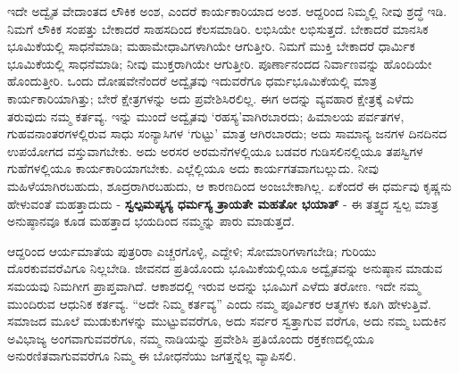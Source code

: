 ಇದೇ ಅದ್ವೈತ ವೇದಾಂತದ ಲೌಕಿಕ ಅಂಶ, ಎಂದರೆ ಕಾರ್ಯಕಾರಿಯಾದ ಅಂಶ. ಆದ್ದರಿಂದ ನಿಮ್ಮಲ್ಲಿ ನೀವು ಶ್ರದ್ಧೆ ಇಡಿ. ನಿಮಗೆ ಲೌಕಿಕ ಸಂಪತ್ತು ಬೇಕಾದರೆ ಸಾಹಸದಿಂದ ಕೆಲಸಮಾಡಿರಿ. ಲಭಿಸಿಯೇ ಲಭಿಸುತ್ತದೆ. ಬೇಕಾದರೆ ಮಾನಸಿಕ ಭೂಮಿಕೆಯಲ್ಲಿ ಸಾಧನೆಮಾಡಿ; ಮಹಾಮೇಧಾವಿಗಳಾಗಿಯೇ ಆಗುತ್ತೀರಿ. ನಿಮಗೆ ಮುಕ್ತಿ ಬೇಕಾದರೆ ಧಾರ್ಮಿಕ ಭೂಮಿಕೆಯಲ್ಲಿ ಸಾಧನೆಮಾಡಿ; ನೀವು ಮುಕ್ತರಾಗಿಯೇ ಆಗುತ್ತೀರಿ. ಪೂರ್ಣಾನಂದದ ನಿರ್ವಾಣವನ್ನು ಹೊಂದಿಯೇ ಹೊಂದುತ್ತೀರಿ. ಒಂದು ದೋಷವೇನೆಂದರೆ ಅದ್ವೈತವು ಇದುವರೆಗೂ ಧರ್ಮಭೂಮಿಕೆಯಲ್ಲಿ ಮಾತ್ರ ಕಾರ್ಯಕಾರಿಯಾಗಿತ್ತು; ಬೇರೆ ಕ್ಷೇತ್ರಗಳನ್ನು ಅದು ಪ್ರವೇಶಿಸಿರಲಿಲ್ಲ. ಈಗ ಅದನ್ನು ವ್ಯವಹಾರ ಕ್ಷೇತ್ರಕ್ಕೆ ಎಳೆದು ತರುವುದು ನಮ್ಮ ಕರ್ತವ್ಯ. ಇನ್ನು ಮುಂದೆ ಅದ್ವೈತವು ‘ರಹಸ್ಯ’ವಾಗಿರಬಾರದು; ಹಿಮಾಲಯ ಪರ್ವತಗಳ, ಗುಹವನಾಂತರಗಳಲ್ಲಿರುವ ಸಾಧು ಸಂನ್ಯಾಸಿಗಳ ‘ಗುಟ್ಟು’ ಮಾತ್ರ ಆಗಿರಬಾರದು; ಅದು ಸಾಮಾನ್ಯ ಜನಗಳ ದಿನದಿನದ ಉಪಯೋಗದ ವಸ್ತುವಾಗಬೇಕು. ಅದು ಅರಸರ ಅರಮನೆಗಳಲ್ಲಿಯೂ ಬಡವರ ಗುಡಿಸಲಿನಲ್ಲಿಯೂ ತಪಸ್ವಿಗಳ ಗುಹೆಗಳಲ್ಲಿಯೂ ಕಾರ್ಯಕಾರಿಯಾಗಬೇಕು. ಎಲ್ಲೆಲ್ಲಿಯೂ ಅದು ಕಾರ್ಯಗತವಾಗಬಲ್ಲುದು. ನೀವು ಮಹಿಳೆಯಾಗಿರಬಹುದು, ಶೂದ್ರರಾಗಿರಬಹುದು, ಆ ಕಾರಣದಿಂದ ಅಂಜಬೇಕಾಗಿಲ್ಲ. ಏಕೆಂದರೆ ಈ ಧರ್ಮವು ಕೃಷ್ಣನು ಹೇಳುವಂತೆ ಮಹತ್ತಾದುದು - \textbf{ಸ್ವಲ್ಪಮಪ್ಯಸ್ಯ ಧರ್ಮಸ್ಯ ತ್ರಾಯತೇ ಮಹತೋ ಭಯಾತ್​} - ಈ ತತ್ತ್ವದ ಸ್ವಲ್ಪ ಮಾತ್ರ ಅನುಷ್ಠಾನವೂ ಕೂಡ ಮಹತ್ತಾದ ಭಯದಿಂದ ನಮ್ಮನ್ನು ಪಾರು ಮಾಡುತ್ತದೆ.

ಆದ್ದರಿಂದ ಆರ್ಯಮಾತೆಯ ಪುತ್ರರಿರಾ ಎಚ್ಚರಗೊಳ್ಳಿ, ಎದ್ದೇಳಿ; ಸೋಮಾರಿಗಳಾಗಬೇಡಿ; ಗುರಿಯು ದೊರಕುವವರೆವಿಗೂ ನಿಲ್ಲಬೇಡಿ. ಜೀವನದ ಪ್ರತಿಯೊಂದು ಭೂಮಿಕೆಯಲ್ಲಿಯೂ ಅದ್ವೈತವನ್ನು ಅನುಷ್ಠಾನ ಮಾಡುವ ಸಮಯವು ನಿಮಗೀಗ ಪ್ರಾಪ್ತವಾಗಿದೆ. ಆಕಾಶದಲ್ಲಿ ಇರುವ ಅದನ್ನು ಭೂಮಿಗೆ ಎಳೆದು ತರೋಣ. ಇದೇ ನಮ್ಮ ಮುಂದಿರುವ ಆಧುನಿಕ ಕರ್ತವ್ಯ. “ಅದೇ ನಿಮ್ಮ ಕರ್ತವ್ಯ” ಎಂದು ನಮ್ಮ ಪೂರ್ವಿಕರ ಆತ್ಮಗಳು ಕೂಗಿ ಹೇಳುತ್ತಿವೆ. ಸಮಾಜದ ಮೂಲೆ ಮುಡುಕುಗಳನ್ನು ಮುಟ್ಟುವವರೆಗೂ, ಅದು ಸರ್ವರ ಸ್ವತ್ತಾಗುವ ವರೆಗೂ, ಅದು ನಮ್ಮ ಬದುಕಿನ ಅವಿಭಾಜ್ಯ ಅಂಗವಾಗುವವರೆಗೂ, ನಮ್ಮ ನಾಡಿಯನ್ನು ಪ್ರವೇಶಿಸಿ ಪ್ರತಿಯೊಂದು ರಕ್ತಕಣದಲ್ಲಿಯೂ ಅನುರಣಿತವಾಗುವವರೆಗೂ ನಿಮ್ಮ ಈ ಬೋಧನೆಯು ಜಗತ್ತನ್ನೆಲ್ಲ ವ್ಯಾಪಿಸಲಿ.

\vskip 2pt

